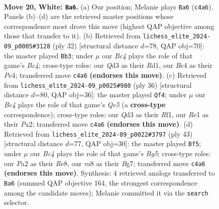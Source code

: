 \documentclass[11pt]{article}
\begin{document}
\begin{figure}[p]
\label{fig:thought-m36}
\end{figure}

\clearpage

\begin{figure}[p]\centering
\begin{subfigure}{0.46\textwidth}\centering
\resizebox{\linewidth}{!}{%
\newchessgame
\chessboard[
  setfen={rr1q2k1/p2b1ppp/5n2/p2p4/2B4P/1P1Q1NP1/P4P2/R3R1K1 w - - 0 20},
  showmover=false,
  pgfstyle=straightmove, color=movearrow, markmove={c4-a6}
]}
\caption{}
\end{subfigure}\hfill
\begin{subfigure}{0.46\textwidth}\centering
\resizebox{\linewidth}{!}{%
\newchessgame
\chessboard[
  setfen={r2qr1k1/p2b1ppp/1p3n2/3p4/2B1PQ2/5N2/P4PPP/3RR1K1 w - - 4 17},
  showmover=false,
  pgfstyle=straightmove, color=movearrow, markmove={c4-b3}
]}
\caption{}
\end{subfigure}
\\[4pt]
\begin{subfigure}{0.46\textwidth}\centering
\resizebox{\linewidth}{!}{%
\newchessgame
\chessboard[
  setfen={r2q1rk1/p2pn1b1/1p4p1/3PQp2/2P5/2N3PN/PP5P/R4RK1 w - - 1 19},
  showmover=false,
  pgfstyle=straightmove, color=movearrow, markmove={e5-f4}
]}
\caption{}
\end{subfigure}\hfill
\begin{subfigure}{0.46\textwidth}\centering
\resizebox{\linewidth}{!}{%
\newchessgame
\chessboard[
  setfen={r3r1k1/p4pb1/1qp3p1/7p/3p1Bb1/3N1PP1/PPP2Q1P/R2R2K1 b - - 2 22},
  showmover=false,
  pgfstyle=straightmove, color=movearrow, markmove={g4-f5}
]}
\caption{}
\end{subfigure}
\caption{\textbf{Move 20, White: \texttt{Ba6}.} (a) Our position; Melanie plays \texttt{Ba6} (\texttt{c4a6}). Panels (b)--(d) are the retrieved master positions whose correspondence most drove this move (highest QAP objective among those that transfer to it). (b) Retrieved from \texttt{lichess\_elite\_2024-09\_p0005\#3128} (ply 32) [structural distance $d$=78, QAP obj=70]: the master played \texttt{Bb3}; under $\mu$ our \emph{Bc4} plays the role of that game's \emph{Bc4}; cross-type roles: our \emph{Q}d3 as their \emph{R}d1, our \emph{B}c4 as their \emph{P}e4; transferred move \texttt{c4a6} \textbf{(endorses this move)}. (c) Retrieved from \texttt{lichess\_elite\_2024-09\_p0025\#980} (ply 36) [structural distance $d$=80, QAP obj=36]: the master played \texttt{Qf4}; under $\mu$ our \emph{Bc4} plays the role of that game's \emph{Qe5} (a \textbf{cross-type} correspondence); cross-type roles: our \emph{Q}d3 as their \emph{R}f1, our \emph{R}e1 as their \emph{P}a2; transferred move \texttt{c4a6} \textbf{(endorses this move)}. (d) Retrieved from \texttt{lichess\_elite\_2024-09\_p0022\#3797} (ply 43) [structural distance $d$=77, QAP obj=30]: the master played \texttt{Bf5}; under $\mu$ our \emph{Bc4} plays the role of that game's \emph{Bg5}; cross-type roles: our \emph{P}a2 as their \emph{R}e8, our \emph{r}a8 as their \emph{B}g7; transferred move \texttt{c4a6} \textbf{(endorses this move)}. Synthesis: 4 retrieved analogs transferred to \texttt{Ba6} (summed QAP objective 164, the strongest correspondence among the candidate moves); Melanie committed it via the \texttt{search} selector.}

\end{figure}
\end{document}
